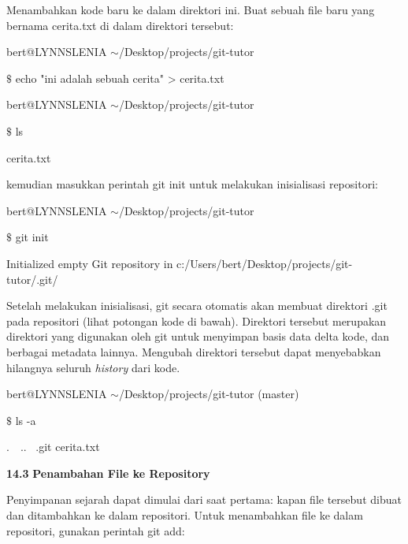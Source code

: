 \vspace{10pt}
Menambahkan kode baru ke dalam direktori ini. Buat sebuah file baru yang bernama cerita.txt di dalam direktori tersebut: \par
\noindent 
{\fontsize{10pt}{10pt}\selectfont bert@LYNNSLENIA  $  \sim  $/Desktop/projects/git-tutor} \par
\noindent 
{\fontsize{10pt}{10pt}\selectfont  $  \$  $ echo "ini adalah sebuah cerita" > cerita.txt} \par
\noindent 
\vspace{10pt}
\noindent 
{\fontsize{10pt}{10pt}\selectfont bert@LYNNSLENIA  $  \sim  $/Desktop/projects/git-tutor} \par
\noindent 
{\fontsize{10pt}{10pt}\selectfont  $  \$  $ ls} \par
\noindent 
{\fontsize{10pt}{10pt}\selectfont cerita.txt} \par
\vspace{12pt}
\noindent 
kemudian masukkan perintah git init untuk melakukan inisialisasi repositori: \par
\noindent 
{\fontsize{10pt}{10pt}\selectfont bert@LYNNSLENIA  $  \sim  $/Desktop/projects/git-tutor} \par
\noindent 
{\fontsize{10pt}{10pt}\selectfont  $  \$  $ git init} \par
\noindent 
{\fontsize{10pt}{10pt}\selectfont Initialized empty Git repository in c:/Users/bert/Desktop/projects/git-tutor/.git/} \par
\vspace{12pt}
Setelah melakukan inisialisasi, git secara otomatis akan membuat direktori .git pada repositori  (lihat potongan kode di bawah). Direktori tersebut merupakan direktori yang digunakan oleh git untuk menyimpan basis data delta kode, dan berbagai metadata lainnya. Mengubah direktori tersebut dapat menyebabkan hilangnya seluruh \emph{history} dari kode. \par
\noindent 
{\fontsize{10pt}{10pt}\selectfont bert@LYNNSLENIA  $  \sim  $/Desktop/projects/git-tutor (master)} \par
\noindent 
{\fontsize{10pt}{10pt}\selectfont  $  \$  $ ls -a} \par
\noindent 
{\fontsize{10pt}{10pt}\selectfont .~~..~ .git  cerita.txt} \par
\noindent 
\vspace{10pt}
\noindent 
\textbf{14.3 }\textbf{Penambahan File ke Repository} \par
\noindent 
 \hspace*{0.64in} Penyimpanan sejarah dapat dimulai dari saat pertama: kapan file tersebut dibuat dan ditambahkan ke dalam repositori. Untuk menambahkan file ke dalam repositori, gunakan perintah git add: \par
